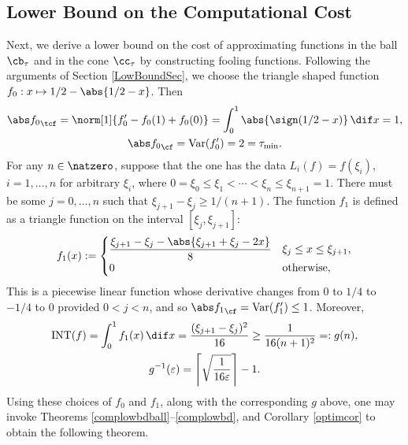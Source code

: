 \subsection{Lower Bound on the Computational Cost}
Next, we derive a lower bound on the cost of approximating functions in the ball $\cb_{\tau}$ and in the cone $\cc_{\tau}$ by constructing fooling functions. Following the arguments of Section \ref{LowBoundSec}, we choose  the triangle shaped function $f_0: x \mapsto 1/2-\abs{1/2-x}$. Then
\begin{gather*}
\Ftnorm{f_0}=\norm[1]{f'_0-f_0(1)+f_0(0)}=\int_0^1 \abs{\sign(1/2-x)} \, \dif x = 1, \\ \Fnorm{f_0}=\Var(f'_0)=2= \tau_{\min}.
\end{gather*}
For any $n \in \natzero$, suppose that the one has the data $L_i(f)=f(\xi_i)$, $i=1, \ldots, n$ for arbitrary $\xi_i$, where $0=\xi_0 \le \xi_1 < \cdots < \xi_n \le \xi_{n+1} = 1$.  There must be some $j=0, \ldots, n$ such that $\xi_{j+1} - \xi_j \ge 1/(n+1)$.  The function $f_{1}$ is defined as a triangle function on the interval $[\xi_j, \xi_{j+1}]$:
$$
f_{1}(x):=\begin{cases} \displaystyle
\frac{\xi_{j+1}-\xi_{j}-\abs{\xi_{j+1}+\xi_{j}-2x}}{8} & \xi_{j} \le x \leq \xi_{j+1},\\
0 & \text{otherwise},
\end{cases}
$$
This is a piecewise linear function whose derivative changes from $0$ to $1/4$ to $-1/4$ to $0$ provided $0 < j < n$, and so $\Fnorm{f_1}=\Var(f'_1)\le 1$. Moreover, 
\begin{gather*}
\INT(f)=\int_0^1 f_1(x) \, \dif x = \frac{(\xi_{j+1} - \xi_j)^2}{16} \ge \frac{1}{16(n+1)^2} =: g(n),\\
g^{-1}(\varepsilon)=\left \lceil \sqrt{\frac{1}{16 \varepsilon}} \right \rceil - 1.
\end{gather*}
Using these choices of $f_0$ and $f_1$, along with the corresponding $g$ above, one may invoke Theorems \ref{complowbdball}--\ref{complowbd}, and Corollary \ref{optimcor} to obtain the following theorem.

